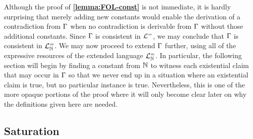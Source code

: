 Although the proof of \textbf{\ref{lemma:FOL-const}} is not immediate, it is hardly surprising that merely adding new constants would enable the derivation of a contradiction from $\Gamma$ when no contradiction is derivable from $\Gamma$ without those additional constants.
Since $\Gamma$ is consistent in $\mathcal{L}^{=}$, we may conclude that $\Gamma$ is consistent in $\mathcal{L}^{=}_{\mathbb{N}}$.
We may now proceed to extend $\Gamma$ further, using all of the expressive resources of the extended language $\mathcal{L}^{=}_{\mathbb{N}}$. 
In particular, the following section will begin by finding a constant from $\mathbb{N}$ to witness each existential claim that may occur in $\Gamma$ so that we never end up in a situation where an existential claim is true, but no particular instance is true. 
Nevertheless, this is one of the more opaque portions of the proof where it will only become clear later on why the definitions given here are needed.





\subsection{Saturation}%
  \label{sub:Saturation}

